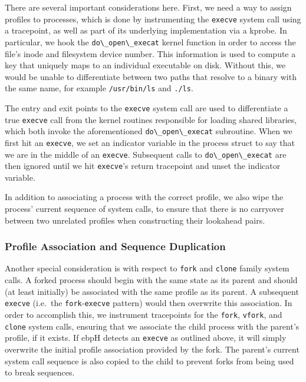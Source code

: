 \documentclass[
  12pt]{findlay}
\newcommand{\passthrough}[1]{#1}
\begin{document}
There are several important considerations here. First, we need a way to
assign profiles to processes, which is done by instrumenting the
\passthrough{\lstinline!execve!} system call using a tracepoint, as well
as part of its underlying implementation via a kprobe. In particular, we
hook the \passthrough{\lstinline!do\_open\_execat!} kernel function in
order to access the file's inode and filesystem device number. This
information is used to compute a key that uniquely maps to an individual
executable on disk. Without this, we would be unable to differentiate
between two paths that resolve to a binary with the same name, for
example \passthrough{\lstinline!/usr/bin/ls!} and
\passthrough{\lstinline!./ls!}.

The entry and exit points to the \passthrough{\lstinline!execve!} system
call are used to differentiate a true \passthrough{\lstinline!execve!}
call from the kernel routines responsible for loading shared libraries,
which both invoke the aforementioned
\passthrough{\lstinline!do\_open\_execat!} subroutine. When we first hit
an \passthrough{\lstinline!execve!}, we set an indicator variable in the
process struct to say that we are in the middle of an
\passthrough{\lstinline!execve!}. Subsequent calls to
\passthrough{\lstinline!do\_open\_execat!} are then ignored until we hit
\passthrough{\lstinline!execve!}'s return tracepoint and unset the
indicator variable.

In addition to associating a process with the correct profile, we also
wipe the process' current sequence of system calls, to ensure that there
is no carryover between two unrelated profiles when constructing their
lookahead pairs.

\hypertarget{profile-association-and-sequence-duplication}{%
\subsubsection{Profile Association and Sequence
Duplication}\label{profile-association-and-sequence-duplication}}

Another special consideration is with respect to
\passthrough{\lstinline!fork!} and \passthrough{\lstinline!clone!}
family system calls. A forked process should begin with the same state
as its parent and should (at least initially) be associated with the
same profile as its parent. A subsequent
\passthrough{\lstinline!execve!} (i.e.~the
\passthrough{\lstinline!fork!}-\passthrough{\lstinline!execve!} pattern)
would then overwrite this association. In order to accomplish this, we
instrument tracepoints for the \passthrough{\lstinline!fork!},
\passthrough{\lstinline!vfork!}, and \passthrough{\lstinline!clone!}
system calls, ensuring that we associate the child process with the
parent's profile, if it exists. If ebpH detects an
\passthrough{\lstinline!execve!} as outlined above, it will simply
overwrite the initial profile association provided by the fork. The
parent's current system call sequence is also copied to the child to
prevent forks from being used to break sequences.
\end{document}
